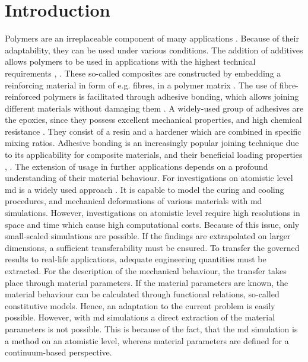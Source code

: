 \chapter{Introduction}\label{chap:introduction}

Polymers are an irreplaceable component of many applications \cite{koltzenburg_polymere_2024}. 
Because of their adaptability, they can be used under various conditions.
The addition of additives allows polymers to be used in applications with the highest technical requirements \cite{ries_characterization_2023}, \cite{rajak_fiber-reinforced_2019}.
These so-called composites are constructed by embedding a reinforcing material in form of e.g. fibres, in a polymer matrix \cite{jeevi_review_2019}.
The use of fibre-reinforced polymers is facilitated through adhesive bonding, which allows joining different materials without damaging them \cite{ries_deciphering_nodate}. 
A widely-used group of adhesives are the epoxies, since they possess excellent mechanical properties, and high chemical resistance \cite{prolongo_comparative_2006}. 
They consist of a resin and a hardener which are combined in specific mixing ratios. 
Adhesive bonding is an increasingly popular joining technique due to its applicability for composite materials, and their beneficial loading properties \cite{campilho_extended_2011}, \cite{pramanik_joining_2017}.
The extension of usage in further applications depends on a profound understanding of their material behaviour.
For investigations on atomistic level \acrfull{md} is a widely used approach  \cite{ries_mechanical_2024}. It is capable to model the curing and cooling  procedures, and mechanical deformations of various materials \cite{ries_deciphering_nodate} with \acrshort{md} simulations. However, investigations on atomistic level require high resolutions in space and time which cause high computational costs. Because of this issue, only small-scaled simulations are possible. If the findings are extrapolated on larger dimensions, a sufficient transferability must be ensured.
To transfer the governed results to real-life applications, adequate engineering quantities must be extracted. For the description of the mechanical behaviour, the transfer takes place through material parameters. 
If the material parameters are known, the material behaviour can be calculated through functional relations, so-called constitutive models.
Hence, an adaptation to the current problem is easily possible.
However, with \acrshort{md} simulations a direct extraction of the material parameters is not possible. This is because of the fact, that the \acrshort{md} simulation is a method on an atomistic level, whereas material parameters are defined for a continuum-based perspective.
